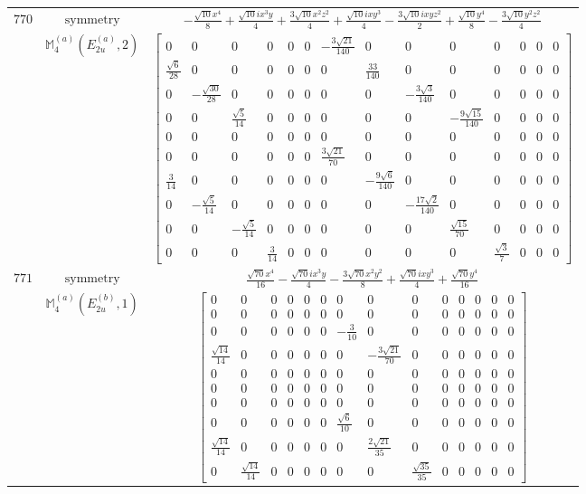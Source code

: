 \documentclass[fleqn,8pt,landscape]{jsarticle}
\begin{document}
\begin{longtable}{ccc}
$ 770 $ & $ \text{symmetry} $ & $ - \frac{\sqrt{10} x^{4}}{8} + \frac{\sqrt{10} i x^{3} y}{4} + \frac{3 \sqrt{10} x^{2} z^{2}}{4} + \frac{\sqrt{10} i x y^{3}}{4} - \frac{3 \sqrt{10} i x y z^{2}}{2} + \frac{\sqrt{10} y^{4}}{8} - \frac{3 \sqrt{10} y^{2} z^{2}}{4} $ \\
$  $ & $ \mathbb{M}_{4}^{(a)}(E_{2u}^{(a)},2) $ & $ \begin{bmatrix} 0 & 0 & 0 & 0 & 0 & 0 & - \frac{3 \sqrt{21}}{140} & 0 & 0 & 0 & 0 & 0 & 0 & 0 \\ \frac{\sqrt{6}}{28} & 0 & 0 & 0 & 0 & 0 & 0 & \frac{33}{140} & 0 & 0 & 0 & 0 & 0 & 0 \\ 0 & - \frac{\sqrt{30}}{28} & 0 & 0 & 0 & 0 & 0 & 0 & - \frac{3 \sqrt{3}}{140} & 0 & 0 & 0 & 0 & 0 \\ 0 & 0 & \frac{\sqrt{5}}{14} & 0 & 0 & 0 & 0 & 0 & 0 & - \frac{9 \sqrt{15}}{140} & 0 & 0 & 0 & 0 \\ 0 & 0 & 0 & 0 & 0 & 0 & 0 & 0 & 0 & 0 & 0 & 0 & 0 & 0 \\ 0 & 0 & 0 & 0 & 0 & 0 & \frac{3 \sqrt{21}}{70} & 0 & 0 & 0 & 0 & 0 & 0 & 0 \\ \frac{3}{14} & 0 & 0 & 0 & 0 & 0 & 0 & - \frac{9 \sqrt{6}}{140} & 0 & 0 & 0 & 0 & 0 & 0 \\ 0 & - \frac{\sqrt{5}}{14} & 0 & 0 & 0 & 0 & 0 & 0 & - \frac{17 \sqrt{2}}{140} & 0 & 0 & 0 & 0 & 0 \\ 0 & 0 & - \frac{\sqrt{5}}{14} & 0 & 0 & 0 & 0 & 0 & 0 & \frac{\sqrt{15}}{70} & 0 & 0 & 0 & 0 \\ 0 & 0 & 0 & \frac{3}{14} & 0 & 0 & 0 & 0 & 0 & 0 & \frac{\sqrt{3}}{7} & 0 & 0 & 0 \end{bmatrix} $ \\ \hline
$ 771 $ & $ \text{symmetry} $ & $ \frac{\sqrt{70} x^{4}}{16} - \frac{\sqrt{70} i x^{3} y}{4} - \frac{3 \sqrt{70} x^{2} y^{2}}{8} + \frac{\sqrt{70} i x y^{3}}{4} + \frac{\sqrt{70} y^{4}}{16} $ \\
$  $ & $ \mathbb{M}_{4}^{(a)}(E_{2u}^{(b)},1) $ & $ \begin{bmatrix} 0 & 0 & 0 & 0 & 0 & 0 & 0 & 0 & 0 & 0 & 0 & 0 & 0 & 0 \\ 0 & 0 & 0 & 0 & 0 & 0 & 0 & 0 & 0 & 0 & 0 & 0 & 0 & 0 \\ 0 & 0 & 0 & 0 & 0 & 0 & - \frac{3}{10} & 0 & 0 & 0 & 0 & 0 & 0 & 0 \\ \frac{\sqrt{14}}{14} & 0 & 0 & 0 & 0 & 0 & 0 & - \frac{3 \sqrt{21}}{70} & 0 & 0 & 0 & 0 & 0 & 0 \\ 0 & 0 & 0 & 0 & 0 & 0 & 0 & 0 & 0 & 0 & 0 & 0 & 0 & 0 \\ 0 & 0 & 0 & 0 & 0 & 0 & 0 & 0 & 0 & 0 & 0 & 0 & 0 & 0 \\ 0 & 0 & 0 & 0 & 0 & 0 & 0 & 0 & 0 & 0 & 0 & 0 & 0 & 0 \\ 0 & 0 & 0 & 0 & 0 & 0 & \frac{\sqrt{6}}{10} & 0 & 0 & 0 & 0 & 0 & 0 & 0 \\ \frac{\sqrt{14}}{14} & 0 & 0 & 0 & 0 & 0 & 0 & \frac{2 \sqrt{21}}{35} & 0 & 0 & 0 & 0 & 0 & 0 \\ 0 & \frac{\sqrt{14}}{14} & 0 & 0 & 0 & 0 & 0 & 0 & \frac{\sqrt{35}}{35} & 0 & 0 & 0 & 0 & 0 \end{bmatrix} $ \\ \hline

\end{longtable}
\end{document}
